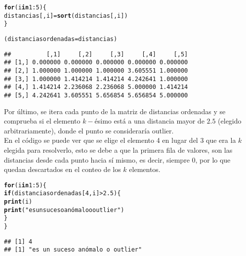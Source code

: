 \documentclass[12pt]{report}\usepackage[]{graphicx}\usepackage[dvipsnames]{xcolor}
\makeatletter
\newcommand{\hlnum}[1]{\textcolor[rgb]{0.686,0.059,0.569}{#1}}%
\newcommand{\hlstr}[1]{\textcolor[rgb]{0.192,0.494,0.8}{#1}}%
\newcommand{\hlopt}[1]{\textcolor[rgb]{0,0,0}{#1}}%
\newcommand{\hlstd}[1]{\textcolor[rgb]{0.345,0.345,0.345}{#1}}%
\newcommand{\hlkwa}[1]{\textcolor[rgb]{0.161,0.373,0.58}{\textbf{#1}}}%
\newcommand{\hlkwb}[1]{\textcolor[rgb]{0.69,0.353,0.396}{#1}}%
\newcommand{\hlkwd}[1]{\textcolor[rgb]{0.737,0.353,0.396}{\textbf{#1}}}%
\newenvironment{kframe}{%
 \def\at@end@of@kframe{}%
 \ifinner\ifhmode%
  \def\at@end@of@kframe{\end{minipage}}%
  \begin{minipage}{\columnwidth}%
 \fi\fi%
 \def\FrameCommand##1{\hskip\@totalleftmargin \hskip-\fboxsep
 \colorbox{shadecolor}{##1}\hskip-\fboxsep
     \hskip-\linewidth \hskip-\@totalleftmargin \hskip\columnwidth}%
 \MakeFramed {\advance\hsize-\width
   \@totalleftmargin\z@ \linewidth\hsize
   \@setminipage}}%
 {\par\unskip\endMakeFramed%
 \at@end@of@kframe}
\newenvironment{knitrout}{}{} %
\makeatother
\begin{document}
\begin{knitrout}
\color{fgcolor}\begin{kframe}
\begin{alltt}
\hlkwa{for} \hlstd{(i} \hlkwa{in} \hlnum{1}\hlopt{:}\hlnum{5}\hlstd{) \{}
        \hlstd{distancias[,i]} \hlkwb{=} \hlkwd{sort}\hlstd{(distancias[,i])}
\hlstd{\}}

\hlstd{(distanciasordenadas}\hlkwb{=}\hlstd{distancias)}
\end{alltt}
\begin{verbatim}
##          [,1]     [,2]     [,3]     [,4]     [,5]
## [1,] 0.000000 0.000000 0.000000 0.000000 0.000000
## [2,] 1.000000 1.000000 1.000000 3.605551 1.000000
## [3,] 1.000000 1.414214 1.414214 4.242641 1.000000
## [4,] 1.414214 2.236068 2.236068 5.000000 1.414214
## [5,] 4.242641 3.605551 5.656854 5.656854 5.000000
\end{verbatim}
\end{kframe}
\end{knitrout}
					
					Por último, se itera cada punto de la matriz de distancias ordenadas y se comprueba si el elemento $k-$ésimo está a una distancia mayor de $2.5$ (elegido arbitrariamente), donde el punto se consideraría outlier.\\
					
					En el código se puede ver que se elige el elemento 4 en lugar del 3 que era la $k$ elegida para resolverlo, esto se debe a que la primera fila de valores, son las distancias desde cada punto hacia sí mismo, es decir, siempre 0, por lo que quedan descartados en el conteo de los $k$ elementos.
					
\begin{knitrout}
\color{fgcolor}\begin{kframe}
\begin{alltt}
\hlkwa{for} \hlstd{(i} \hlkwa{in} \hlnum{1}\hlopt{:}\hlnum{5}\hlstd{) \{}
        \hlkwa{if} \hlstd{(distanciasordenadas[}\hlnum{4}\hlstd{,i]} \hlopt{>} \hlnum{2.5}\hlstd{) \{}
                \hlkwd{print}\hlstd{(i)}
                \hlkwd{print}\hlstd{(}\hlstr{"es un suceso anómalo o outlier"}\hlstd{)}
        \hlstd{\}}
\hlstd{\}}
\end{alltt}
\begin{verbatim}
## [1] 4
## [1] "es un suceso anómalo o outlier"
\end{verbatim}
\end{kframe}
\end{knitrout}
					
\end{document}
